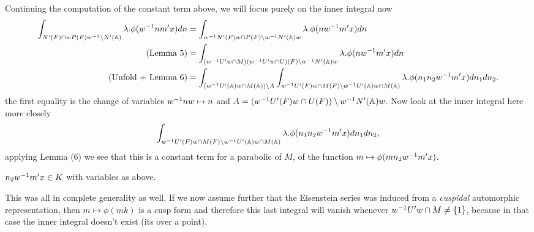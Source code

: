     Continuing the computation of the constant term above, we will focus purely on the inner integral now
    \begin{equation*}
        \begin{aligned}
            \int_{N'(F)\cap wP(F)w\inv \setminus N'(\A)} \lambda.\phi( w\inv nm' x)  dn &= \int_{w\inv N'(F)w \cap P(F) \setminus w\inv N'(\A)w} \lambda.\phi( nw\inv m' x)  dn \\
            (\text{Lemma 5})&= \int_{(w\inv U' w \cap M)(w\inv U' w \cap U)(F) \setminus w\inv N'(\A)w} \lambda.\phi( nw\inv m' x)  dn \\
            (\text{Unfold + Lemma 6})  &= \int_{(w\inv U'(\A)w \cap M(\A)) \setminus A} \int_{w\inv U'(F) w \cap M(F) \setminus w\inv U'(\A)w \cap M(\A)} \lambda.\phi( n_1 n_2 w\inv m' x)  dn_1 dn_2. \\
        \end{aligned}
    \end{equation*}
    the first equality is the change of variables \(w^{-1} n w\mapsto n \) and \(A = (w\inv U'(F) w \cap U(F) ) \setminus w\inv N'(\A)w \). Now look at the inner integral here more closely 
    \[ \int_{w\inv U'(F) w \cap M(F) \setminus w\inv U'(\A)w \cap M(\A)}\lambda. \phi( n_1 n_2 w\inv m' x)  dn_1 dn_2,\]
    applying Lemma (6) we see that this is a constant term for a parabolic of \(M\), of the function \(m\mapsto \phi(m n_2 w\inv m' x)\). 
    \begin{Lemma}
        \(n_2 w^{-1} m' x \in K\) with variables as above.
    \end{Lemma}
    This was all in complete generality as well. If we now assume further that the Eisenstein series was induced from a \textit{cuspidal} automorphic representation, then \(m\mapsto \phi(mk)\) is a cusp form and therefore this last integral will vanish whenever \(w^{-1} U'w \cap M \neq \{1\}\), because in that case the inner integral doesn't exist (its over a point).

